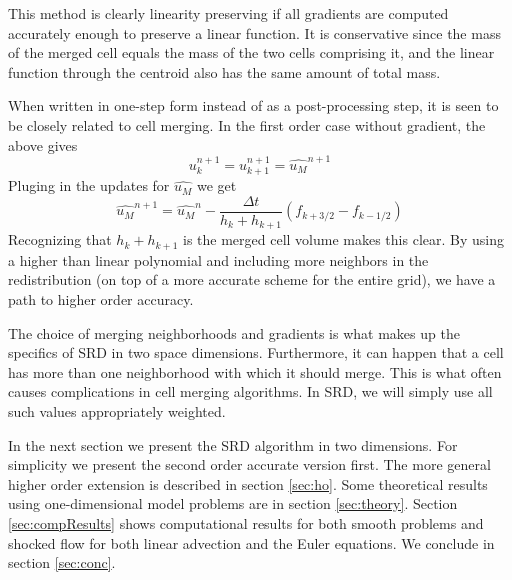 This method is clearly linearity preserving if all gradients are
computed accurately enough to preserve a linear function.  
It is conservative since the mass of the merged cell equals the mass of
the two cells comprising it, and the linear function through the
centroid also has the same amount of total mass.

When written in one-step form instead of as a post-processing step, 
it is seen to be closely related to cell merging. 
In the first order case without gradient, the above gives
\begin{equation}
u_k^{n+1} = u_{k+1}^{n+1} = \widehat{u_M}^{n+1} 
\end{equation}
Pluging in the updates for $\widehat{u_M}$ we get
\begin{equation}
\widehat{u_M}^{n+1} = \widehat{u_M}^n - 
\frac{\Delta t}{h_k + h_{k+1}} (f_{k+3/2} - f_{k-1/2})
\end{equation}
Recognizing that $h_k+h_{k+1}$ is the merged cell volume makes this
clear.
By using a higher than linear polynomial and
including more neighbors in the
redistribution (on top of a more accurate scheme for the entire grid),
we have a path to higher order accuracy.

The choice of merging neighborhoods and gradients is what makes up the
specifics of SRD in two space dimensions. Furthermore, it can happen
that a cell has more than one neighborhood with
which it should merge. This is what often causes complications in cell
merging algorithms. In SRD, we will simply use all such values appropriately
weighted.

In the next section we present the SRD algorithm in two dimensions.
For simplicity we present the second order accurate version first.
The more general higher order extension is described in 
section \ref{sec:ho}.
Some theoretical results using one-dimensional model problems are in
section \ref{sec:theory}. 
Section \ref{sec:compResults} shows computational results for both smooth
problems and shocked flow for both linear advection and the Euler equations.  We conclude in section \ref{sec:conc}.
